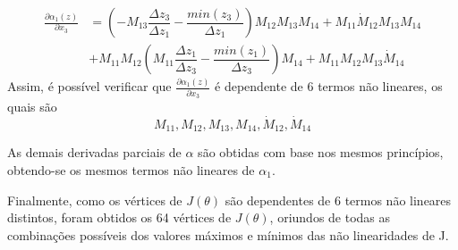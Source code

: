 \begin{align*}
\frac{\partial\alpha_1(z)}{\partial x_3} &= (-{M}_{13}\dfrac{\Delta z_3}{\Delta z_1}-\dfrac{min(z_3)}{\Delta z_1})M_{12}M_{13}M_{14}+M_{11}\dot{M}_{12}M_{13}M_{14}\\
&+ M_{11}M_{12}({M}_{11}\dfrac{\Delta z_1}{\Delta z_3}-\dfrac{min(z_1)}{\Delta z_3})M_{14}+M_{11}M_{12}M_{13}\dot{M}_{14}
\end{align*}
Assim, é possível verificar que $\frac{\partial\alpha_1(z)}{\partial x_3}$ é dependente de 6 termos não lineares, os quais são
\begin{equation*}
M_{11}, M_{12}, M_{13}, M_{14}, \dot{M}_{12}, \dot{M}_{14}
\end{equation*}

As demais derivadas parciais de $\alpha$ são obtidas com base nos mesmos princípios, obtendo-se os mesmos termos não lineares de $\alpha_1$.

Finalmente, como os vértices de $J(\theta)$ são dependentes de 6 termos não lineares distintos, foram obtidos os 64 vértices de $J(\theta)$, oriundos de todas as combinações possíveis dos valores máximos e mínimos das não linearidades de J.

